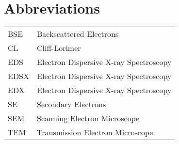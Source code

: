 \chapter*{Abbreviations}

\begin{table}
    \begin{tabular}{ll}
        BSE  & Backscattered Electrons                \\
        CL   & Cliff-Lorimer                          \\
        EDS  & Electron Dispersive X-ray Spectroscopy \\
        EDSX & Electron Dispersive X-ray Spectroscopy \\
        EDX  & Electron Dispersive X-ray Spectroscopy \\
        SE   & Secondary Electrons                    \\
        SEM  & Scanning Electron Microscope           \\
        TEM  & Transmission Electron Microscope       \\
    \end{tabular}

\end{table}


